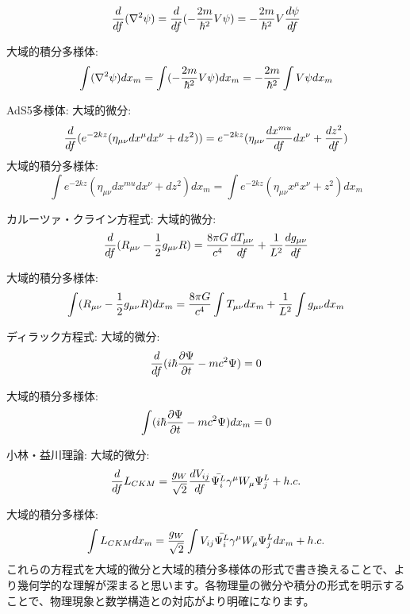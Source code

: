 \documentclass{jsarticle}
\begin{document}
\title{}
\author{}
\date{}
\maketitle

$$ {d \over {d f}}(\nabla^2 \psi) = {d \over {d f}}(-{2m \over \hbar^2} V \psi) \\
= -{2m \over \hbar^2} V {d \psi \over d f}$$

大域的積分多様体:
$$\int (\nabla^2 \psi) d x_m = \int (-{2m \over \hbar^2} V \psi) d x_m \\
= -{2m \over \hbar^2} \int V \psi d x_m
$$

AdS5多様体:
大域的微分:
$${d \over {d f}} (e^{-2kz} (\eta_{\mu\nu} d x^{\mu} d x^{\nu} + d z^2)) = e^{-2kz} (\eta_{\mu\nu} {d x^{mu} \over {d f}} d x^{\nu} + {d z^2 \over d f})
$$
大域的積分多様体:
$$
\int e^{-2kz} (\eta_{\mu\nu} d x^{mu} d x^{\nu} + d z^2) d x_m = \int e^{-2kz} (\eta_{\mu\nu} x^{\mu} x^{\nu} + z^2) d x_m
$$

カルーツァ・クライン方程式:
大域的微分:
$${d \over {d f}} (R_{\mu\nu} - {1 \over 2} g_{\mu\nu} R) = {8\pi G \over c^4} {d T_{\mu\nu} \over d f} + {1 \over L^2} {d g_{\mu\nu} \over d f}
$$

大域的積分多様体:
$$\int (R_{\mu\nu} - {1 \over 2} g_{\mu\nu} R) d x_m = {8\pi G \over c^4} \int T_{\mu\nu} d x_m + {1 \over L^2} \int g_{\mu\nu} d x_m
$$

ディラック方程式:
大域的微分:
$$
{d \over {d f}} (i\hbar {\partial \Psi \over \partial t} - mc^2 \Psi) = 0
$$

大域的積分多様体:
$$\int (i\hbar {\partial \Psi \over \partial t} - mc^2 \Psi) d x_m = 0
$$

小林・益川理論:
大域的微分:
$${d \over {d f}} L_{CKM} = {g_W \over \sqrt{2}} {d V_{ij} \over d f} \bar{\Psi_i^L} \gamma^{\mu} W_{\mu} \Psi_j^L + h.c.
$$

大域的積分多様体:
$$\int L_{CKM} d x_m = {g_W \over \sqrt{2}} \int V_{ij} \bar{\Psi_i^L} \gamma^{\mu} W_{\mu} \Psi_j^L d x_m + h.c.
$$
これらの方程式を大域的微分と大域的積分多様体の形式で書き換えることで、より幾何学的な理解が深まると思います。各物理量の微分や積分の形式を明示することで、物理現象と数学構造との対応がより明確になります。
\end{document}
